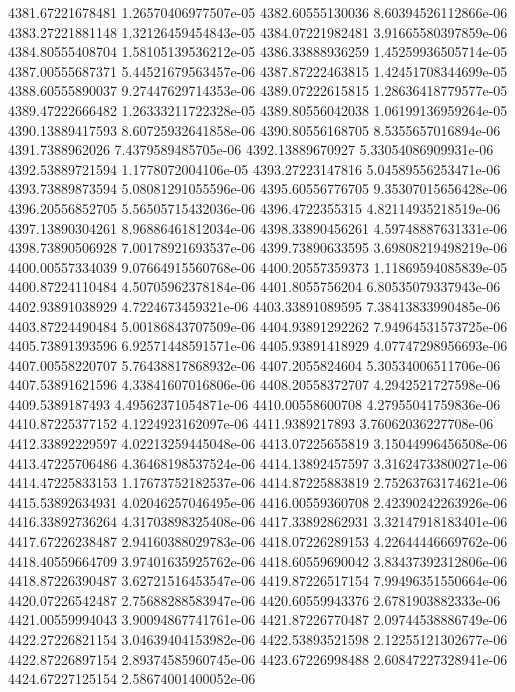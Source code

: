 {4381.67221678481 1.26570406977507e-05
4382.60555130036 8.60394526112866e-06
4383.27221881148 1.32126459454843e-05
4384.07221982481 3.91665580397859e-06
4384.80555408704 1.58105139536212e-05
4386.33888936259 1.45259936505714e-05
4387.00555687371 5.44521679563457e-06
4387.87222463815 1.42451708344699e-05
4388.60555890037 9.27447629714353e-06
4389.07222615815 1.28636418779577e-05
4389.47222666482 1.26333211722328e-05
4389.80556042038 1.06199136959264e-05
4390.13889417593 8.60725932641858e-06
4390.80556168705 8.5355657016894e-06
4391.7388962026 7.4379589485705e-06
4392.13889670927 5.33054086909931e-06
4392.53889721594 1.1778072004106e-05
4393.27223147816 5.04589556253471e-06
4393.73889873594 5.08081291055596e-06
4395.60556776705 9.35307015656428e-06
4396.20556852705 5.56505715432036e-06
4396.4722355315 4.82114935218519e-06
4397.13890304261 8.96886461812034e-06
4398.33890456261 4.59748887631331e-06
4398.73890506928 7.00178921693537e-06
4399.73890633595 3.69808219498219e-06
4400.00557334039 9.07664915560768e-06
4400.20557359373 1.11869594085839e-05
4400.87224110484 4.50705962378184e-06
4401.8055756204 6.80535079337943e-06
4402.93891038929 4.7224673459321e-06
4403.33891089595 7.38413833990485e-06
4403.87224490484 5.00186843707509e-06
4404.93891292262 7.94964531573725e-06
4405.73891393596 6.92571448591571e-06
4405.93891418929 4.07747298956693e-06
4407.00558220707 5.76438817868932e-06
4407.2055824604 5.30534006511706e-06
4407.53891621596 4.33841607016806e-06
4408.20558372707 4.2942521727598e-06
4409.5389187493 4.49562371054871e-06
4410.00558600708 4.27955041759836e-06
4410.87225377152 4.1224923162097e-06
4411.9389217893 3.76062036227708e-06
4412.33892229597 4.02213259445048e-06
4413.07225655819 3.15044996456508e-06
4413.47225706486 4.36468198537524e-06
4414.13892457597 3.31624733800271e-06
4414.47225833153 1.17673752182537e-06
4414.87225883819 2.75263763174621e-06
4415.53892634931 4.02046257046495e-06
4416.00559360708 2.42390242263926e-06
4416.33892736264 4.31703898325408e-06
4417.33892862931 3.32147918183401e-06
4417.67226238487 2.94160388029783e-06
4418.07226289153 4.22644446669762e-06
4418.40559664709 3.97401635925762e-06
4418.60559690042 3.83437392312806e-06
4418.87226390487 3.62721516453547e-06
4419.87226517154 7.99496351550664e-06
4420.07226542487 2.75688288583947e-06
4420.60559943376 2.6781903882333e-06
4421.00559994043 3.90094867741761e-06
4421.87226770487 2.09744538886749e-06
4422.27226821154 3.04639404153982e-06
4422.53893521598 2.12255121302677e-06
4422.87226897154 2.89374585960745e-06
4423.67226998488 2.60847227328941e-06
4424.67227125154 2.58674001400052e-06
}
